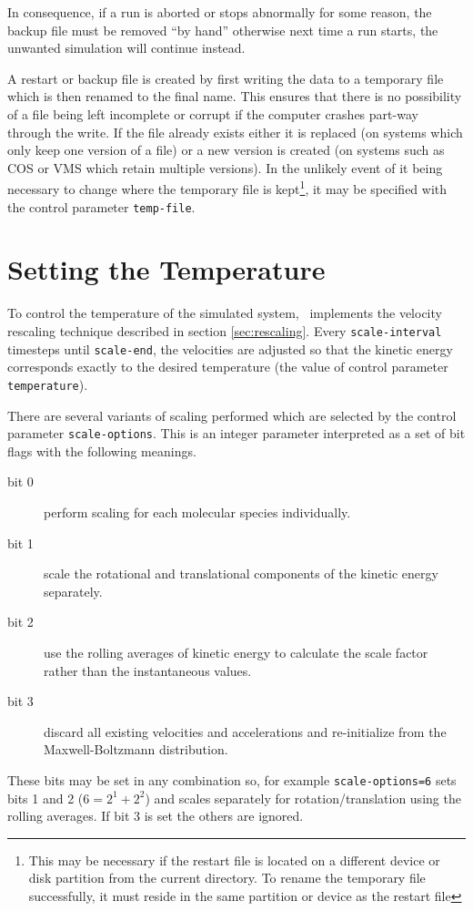 In consequence, if a run is aborted or stops abnormally for some
reason, the backup file must be removed ``by hand'' otherwise next
time a run starts, the unwanted simulation will continue instead.

A restart or backup file is created by first writing the data to a
temporary file which is then renamed to the final name.  This ensures
that there is no possibility of a file being left incomplete or
corrupt if the computer crashes part-way through the write.  If the
file already exists either it is replaced (on systems which only keep
one version of a file) or a new version is created (on systems such as
COS or VMS which retain multiple versions).  In the unlikely event of
it being necessary to change where the temporary file is
kept\footnote{This may be necessary if the restart file is located on
a different device or disk partition from the current directory. To
rename the temporary file successfully, it must reside in the same
partition or device as the restart file}, it may be specified with the
control parameter
\verb'temp-file'.

\section{Setting the Temperature}

To control the temperature of the simulated system, \moldy\  implements
the velocity rescaling technique described in section
\ref{sec:rescaling}.  Every \verb'scale-interval' timesteps until
\verb'scale-end', the velocities are adjusted so that the kinetic
energy corresponds exactly to the desired temperature (the value of
control parameter \verb'temperature').

There are several variants of scaling performed which are selected
by the control parameter \verb'scale-options'.  This is an integer
parameter interpreted as a set of bit flags with the following meanings.
\begin{description}
\item[bit 0]	perform scaling for each molecular species individually.
\item[bit 1]	scale the rotational and translational components of
the kinetic energy separately.
\item[bit 2]	use the rolling averages of kinetic energy to
calculate the scale factor rather than the instantaneous values.
\item[bit 3]    discard all existing velocities and accelerations and
re-initialize from the Maxwell-Boltzmann distribution.
\end{description}
These bits may be set in any combination so, for example
\verb'scale-options=6' sets bits 1 and 2 ($ 6 = 2^1 + 2^2$) and scales
separately for rotation/translation using the rolling averages.  If
bit 3 is set the others are ignored.

